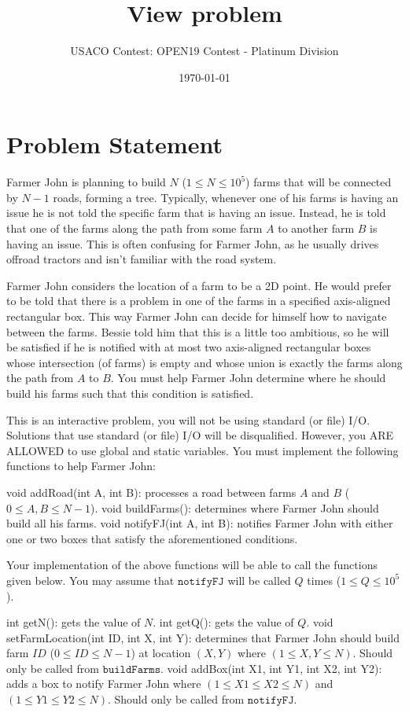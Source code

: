 \documentclass[12pt]{article}
\title{View problem}
\author{USACO Contest: OPEN19 Contest - Platinum Division}
\date{\today}
\begin{document}
\maketitle

\section*{Problem Statement}

Farmer John is planning to build $N$ ($1 \leq N \leq 10^5$) farms that will be
connected by $N-1$ roads, forming a tree. Typically, whenever one of his farms
is having an issue he is not told the specific farm that is having an issue.
Instead, he is told that one of the farms along the path from some farm $A$ to
another farm $B$ is having an issue. This is often confusing for Farmer John, as
he usually drives offroad tractors and isn't familiar with the road system.

Farmer John considers the location of a farm to be a 2D point. He would
prefer to be told that there is a problem in one of the farms in a specified
axis-aligned rectangular box. This way Farmer John can decide for himself how to
navigate between the farms. Bessie told him that this is a little too ambitious,
so he will be satisfied if he is notified with at most two axis-aligned
rectangular boxes whose intersection (of farms) is empty and whose union is
exactly the farms along the path from $A$ to $B$. You must help Farmer John
determine where he should build his farms such that this condition is satisfied.

This is an interactive problem, you will not be using standard (or file) I/O.
 Solutions that use standard (or file) I/O will be disqualified. 
However, you ARE ALLOWED to use global and static variables. You must implement
the following functions to help Farmer John:

  void addRoad(int A, int B): processes a road between farms  $A$ and
$B$ ($0 \le A, B \le N - 1$).
  void buildFarms(): determines where Farmer John should build all
his farms.
  void notifyFJ(int A, int B): notifies Farmer John with either one
or two boxes that satisfy the aforementioned conditions.

Your implementation of the above functions will be able to call the functions
given below.  You may assume that $\texttt{notifyFJ}$ will be called $Q$ times ($1 \leq Q \leq 10^5$).

  int getN(): gets the value of $N$.
  int getQ(): gets the value of $Q$.
  void setFarmLocation(int ID, int X, int Y): determines that Farmer
John should build farm $ID$ ($0 \le ID \le N-1$) at location $(X,Y)$ where 
$(1 \le X, Y \le N )$. Should only be called from $\texttt{buildFarms}$.
  void addBox(int X1, int Y1, int X2, int Y2): adds a box to notify
Farmer John where $(1 \le X1 \le X2 \le N )$ and
$(1 \le Y1 \le Y2 \le N )$. Should only be called from $\texttt{notifyFJ}$. 
\end{document}
